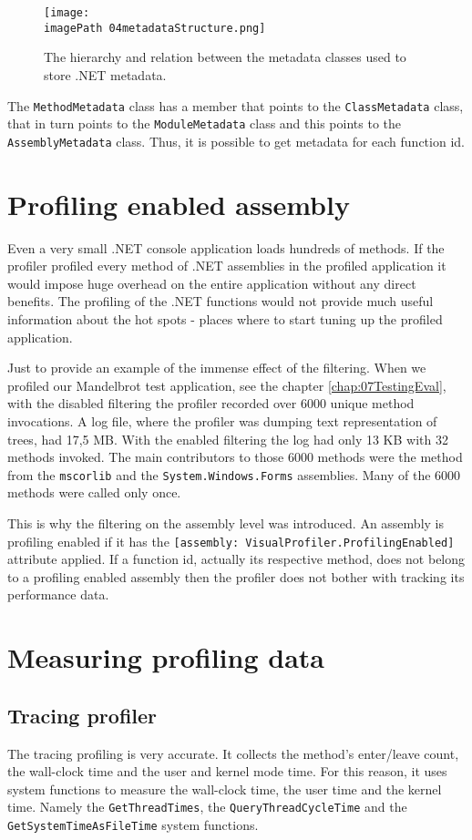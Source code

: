 \begin{figure}
	\centering
		\texttt{[image: \\imagePath 04metadataStructure.png]}
		\caption{The hierarchy and relation between the metadata classes used to store .NET metadata.}
	\label{fig:04metadataStructure}
\end{figure}

The \texttt{MethodMetadata} class has a member that points to the \texttt{ClassMetadata} class, that in turn points to the \texttt{ModuleMetadata} class and this points to the \texttt{AssemblyMetadata} class. Thus, it is possible to get metadata for each function id.

\section{Profiling enabled assembly}
\label{subsubsec:04ProfEnabAssem}
Even a very small .NET console application loads hundreds of methods. If the profiler profiled every method of .NET assemblies in the profiled application it would impose huge overhead on the entire application without any direct benefits. The profiling of the .NET functions would not provide much useful information about the hot spots - places where to start tuning up the profiled application. 

Just to provide an example of the immense effect of the filtering. When we profiled our Mandelbrot test application, see the chapter \ref{chap:07TestingEval}, with the disabled filtering the profiler recorded over 6000 unique method invocations. A log file, where the profiler was dumping text representation of trees, had 17,5 MB. With the enabled filtering the log had only 13 KB with 32 methods invoked. The main contributors to those 6000 methods were the method from the \texttt{mscorlib} and the \texttt{System.Windows.Forms} assemblies. Many of the 6000 methods were called only once.

This is why the filtering on the assembly level was introduced. An assembly is profiling enabled if it has the \texttt{[assembly: VisualProfiler.ProfilingEnabled]} attribute applied. If a function id, actually its respective method, does not belong to a profiling enabled assembly then the profiler does not bother with tracking its performance data.

\section{Measuring profiling data}
\subsection{Tracing profiler}
The tracing profiling is very accurate. It collects the method's enter/leave count, the wall-clock time and the user and kernel mode time. For this reason, it uses system functions to measure the wall-clock time, the user time and the kernel time. Namely the \texttt{GetThreadTimes}, the \texttt{QueryThreadCycleTime} and the \texttt{GetSystemTimeAsFileTime} system functions.

